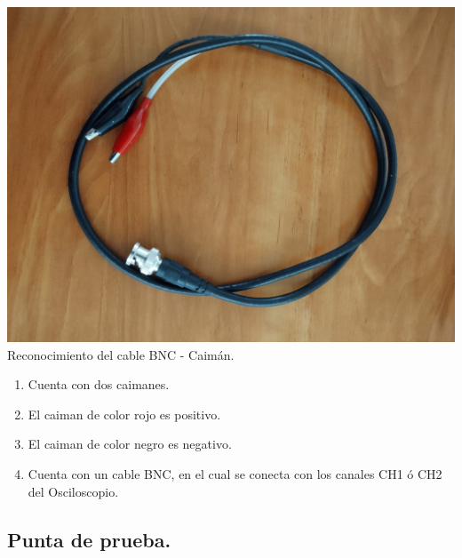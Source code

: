 \documentclass[10pt]{article}
\begin{document}
\begin{multicols}{2}
\begin{center}
\includegraphics[scale=0.1]{Imagenes/caimanes.png}\\
Reconocimiento del cable BNC - Caimán.
\begin{enumerate}
\item Cuenta con dos caimanes.
\item El caiman de color rojo es positivo.
\item El caiman de color negro es negativo.
\item Cuenta con un cable BNC, en el cual se conecta con los canales CH1 ó CH2 del Osciloscopio.
\end{enumerate}
\end{center}

\subsection{Punta de prueba.}


\end{multicols}
\end{document}
